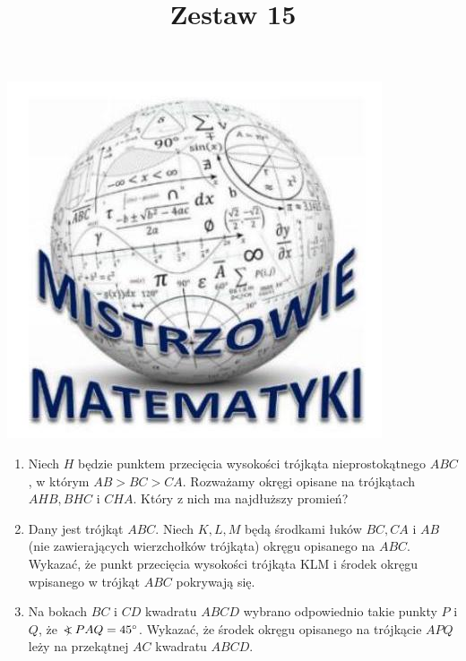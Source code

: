 \documentclass[10pt]{article}
\title{Zestaw 15 }
\author{}
\date{}
\newcommand\Varangle{\mathop{{<\!\!\!\!\!\text{\small)}}\:}\nolimits}
\begin{document}
\maketitle
\begin{center}
\includegraphics[max width=\textwidth]{2024_11_21_8b3a75e60a88ad256c94g-1}
\end{center}

\begin{enumerate}
  \item Niech \(H\) będzie punktem przecięcia wysokości trójkąta nieprostokątnego \(A B C\), w którym \(A B>B C>C A\). Rozważamy okręgi opisane na trójkątach \(A H B, B H C\) i \(C H A\). Który z nich ma najdłuższy promień?
  \item Dany jest trójkąt \(A B C\). Niech \(K, L, M\) będą środkami łuków \(B C, C A\) i \(A B\) (nie zawierających wierzchołków trójkąta) okręgu opisanego na \(A B C\). Wykazać, że punkt przecięcia wysokości trójkąta KLM i środek okręgu wpisanego w trójkąt \(A B C\) pokrywają się.
  \item Na bokach \(B C\) i \(C D\) kwadratu \(A B C D\) wybrano odpowiednio takie punkty \(P\) i \(Q\), że \(\Varangle P A Q=45^{\circ}\). Wykazać, że środek okręgu opisanego na trójkącie \(A P Q\) leży na przekątnej \(A C\) kwadratu \(A B C D\).
\end{enumerate}
\end{document}
